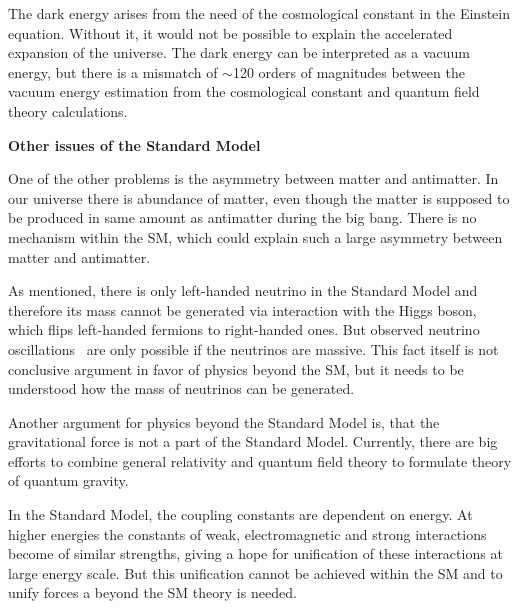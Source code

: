 The dark energy arises from the need of the cosmological constant in the Einstein equation. Without it, it would not be possible to explain the accelerated expansion of the universe. The dark energy can be interpreted as a vacuum energy, but there is a mismatch of $\sim$120 orders of magnitudes between the vacuum energy estimation from the cosmological constant and quantum field theory calculations.



\textbf{Other issues of the Standard Model}

One of the other problems is the asymmetry between matter and antimatter. In our universe there is abundance of matter, even though the matter is supposed to be produced in same amount as antimatter during the big bang. There is no mechanism within the SM, which could explain such a large asymmetry between matter and antimatter.

As mentioned, there is only left-handed neutrino in the Standard Model and therefore its mass cannot be generated via interaction with the Higgs boson, which flips left-handed fermions to right-handed ones. But observed neutrino oscillations~\cite{Fukuda:1998mi, Ahmad:2001an} are only possible if the neutrinos are massive. This fact itself is not conclusive argument in favor of physics beyond the SM, but it needs to be understood how the mass of neutrinos can be generated.

Another argument for physics beyond the Standard Model is, that the gravitational force is not a part of the Standard Model. Currently, there are big efforts to combine general relativity and quantum field theory to formulate theory of quantum gravity.  

In the Standard Model, the coupling constants are dependent on energy. At higher energies the constants of weak, electromagnetic and strong interactions become of similar strengths, giving a hope for unification of these interactions at large energy scale. But this unification cannot be achieved within the SM and to unify forces a beyond the SM theory is needed.
 
